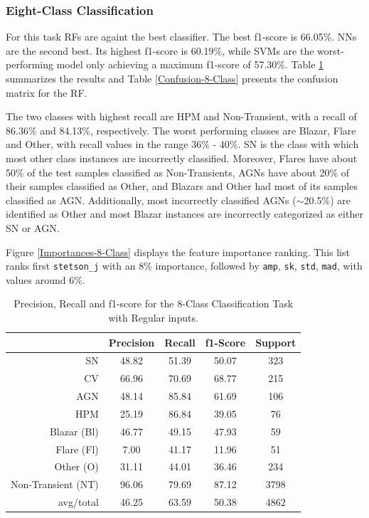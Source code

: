 \documentclass[a4paper,fleqn,usenatbib]{mnras}
\begin{document}
\subsubsection{Eight-Class Classification}


For this task RFs are againt the best classifier.  
The best f1-score is 66.05\%. 
NNs are the second best. 
Its highest f1-score is 60.19\%, while SVMs are the worst-performing
model only achieving a maximum f1-score of 57.30\%.
Table \ref{Overall-Scores-8-Class-Regular} summarizes the results
and Table \ref{Confusion-8-Class} presents the confusion matrix for the RF.

The two classes with highest recall are HPM and Non-Transient, with a
recall of 86.36\% and 84.13\%, respectively. 
The worst performing classes are Blazar, Flare and Other, with recall
values in the range 36\% - 40\%. 
SN is the class with which most other class instances are
incorrectly classified. 
Moreover, Flares have about 50\% of the test samples classified as
Non-Transients, AGNs have about 20\% of their 
samples classified as Other, and Blazars and Other had most of  its
samples classified as AGN. 
Additionally, most incorrectly classified AGNs ($\sim$20.5\%) are
identified as Other and most Blazar instances are
incorrectly categorized as either SN or AGN. 

Figure \ref{Importances-8-Class} displays the feature importance ranking.
This list ranks first \texttt{stetson\_j} with an 8\% importance,
followed by \texttt{amp}, \texttt{sk}, \texttt{std}, \texttt{mad},
with values around 6\%.  


\begin{table}
\centering
\begin{tabular}{|r|c|c|c|c|}
\hline
\multicolumn{1}{|l|}{} & Precision & Recall & f1-Score & Support \\ \hline \hline
SN            &   48.82 &   51.39  &  50.07  &  323 \\ \hline
CV            &   66.96 &   70.69  &  68.77  &  215 \\ \hline
AGN           &   48.14 &   85.84  &  61.69  &  106 \\ \hline
HPM           &   25.19 &   86.84  &  39.05  &   76 \\ \hline
Blazar (Bl)       &   46.77 &   49.15  &  47.93  &   59 \\ \hline
Flare (Fl)      &    7.00 &   41.17  &  11.96  &   51 \\ \hline
Other (O)        &   31.11 &   44.01  &  36.46  &  234 \\ \hline
Non-Transient (NT)&   96.06 &   79.69  &  87.12  & 3798 \\ \hline
avg/total     &   46.25 &   63.59  &  50.38  & 4862 \\ \hline
\end{tabular}
\caption{Precision, Recall and f1-score for the 8-Class Classification Task with Regular inputs.}
\label{Overall-Scores-8-Class-Regular}
\end{table}
\end{document}
